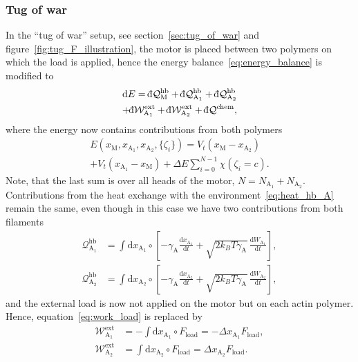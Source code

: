 \documentclass[aps,pre,twocolumn,showpacs,showkeys,superscriptaddress,floatfix]{revtex4-1}
\newcommand{\rmd}{{\mathrm d}}
\newcommand{\dbar}{{\mathchar '26 \mkern-11mu {\mathrm d}}}
\begin{document}
\subsubsection{Tug of war}
In the ``tug of war'' setup, see section~\ref{sec:tug_of_war} and figure~\ref{fig:tug_F_illustration},
the motor is placed between two polymers on which the load is applied,
hence the energy balance~\eqref{eq:energy_balance} is modified to  
\begin{multline}
\rmd E = \dbar {\mathcal Q}_\text{M}^\text{hb} + \dbar {\mathcal Q}_{\text{A}_1}^\text{hb} + \dbar {\mathcal Q}_{\text{A}_2}^\text{hb} 
\\
+ \dbar {\mathcal W}^\text{ext}_{\text{A}_1} + \dbar {\mathcal W}^\text{ext}_{\text{A}_2} + \dbar {\mathcal Q}^\text{chem}, 
\label{eq:energy_balance_two_filaments}
\end{multline}
where the energy now contains contributions from both polymers
\begin{multline*}
E( x_\text{M}, x_{\text{A}_1}, x_{\text{A}_2}, \{ \zeta_i \}) 
= V_t( x_\text{M} - x_{\text{A}_2} ) 
\\
+ V_t( x_{\text{A}_1} - x_\text{M} ) 
+ \Delta E \sum\limits_{i=0}^{N-1} \chi( \zeta_i = c ) .
\end{multline*}
Note, that the last sum is over all heads of the motor, $N = N_{\text{A}_1} + N_{\text{A}_2}$.
Contributions from the heat exchange with the environment~\eqref{eq:heat_hb_A} remain the same, even though in this case we have two contributions from both filaments
\begin{align*}
{\mathcal Q}_{\text{A}_1}^\text{hb} 
&= \int \rmd x_{\text{A}_1} \circ \left[ - \gamma_\text{A} \frac{\rmd x_{\text{A}_1} }{\rmd t} + \sqrt{ 2 k_B T \gamma_\text{A} } \, \frac{ \rmd W_{\text{A}_1} }{ \rmd t } \right] , \\ 
{\mathcal Q}_{\text{A}_2}^\text{hb} 
&= \int \rmd x_{\text{A}_2} \circ \left[ - \gamma_\text{A} \frac{\rmd x_{\text{A}_2} }{\rmd t} + \sqrt{ 2 k_B T \gamma_\text{A} } \, \frac{ \rmd W_{\text{A}_2} }{ \rmd t } \right] ,
\end{align*}
and the external load is now not applied on the motor but on each actin polymer.
Hence, equation~\eqref{eq:work_load} is replaced by
\begin{align*}
{\mathcal W}^\text{ext}_{\text{A}_1} &= - \int \rmd x_{\text{A}_1} \circ F_\text{load} = - \Delta x_{\text{A}_1} F_\text{load}, 
\\
{\mathcal W}^\text{ext}_{\text{A}_2} &= \int \rmd x_{\text{A}_2} \circ F_\text{load} = \Delta x_{\text{A}_2} F_\text{load}. 
\end{align*}
\end{document}
